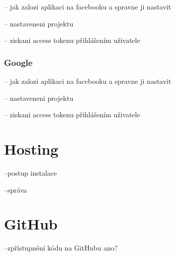 \documentclass[thesis=B,czech]{FITthesis}[2012/06/26]
\begin{document}
-- jak zalozi aplikaci na facebooku a spravne ji nastavit

-- nastaveneni projektu

-- ziskani access tokenu přihlášením uživatele 

\subsubsection{Google}

-- jak zalozi aplikaci na facebooku a spravne ji nastavit

-- nastaveneni projektu

-- ziskani access tokenu přihlášením uživatele 

\section{Hosting}

--postup instalace 

--správa

\section{GitHub}

--zpřístupnění kódu na GitHubu ano?
\end{document}
